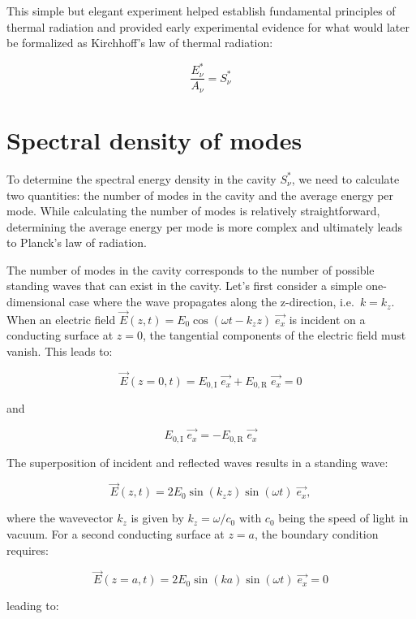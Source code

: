 \documentclass[
  a4paper,
]{book}
\begin{document}
\begin{tcolorbox}
This simple but elegant experiment helped establish fundamental
principles of thermal radiation and provided early experimental evidence
for what would later be formalized as Kirchhoff's law of thermal
radiation:

\[\frac{E^{\ast}_{\nu}}{A_{\nu}} = S^{\ast}_{\nu}\]

\end{tcolorbox}

\section{Spectral density of modes}\label{spectral-density-of-modes}

To determine the spectral energy density in the cavity
\(S^{\ast}_{\nu}\), we need to calculate two quantities: the number of
modes in the cavity and the average energy per mode. While calculating
the number of modes is relatively straightforward, determining the
average energy per mode is more complex and ultimately leads to Planck's
law of radiation.

The number of modes in the cavity corresponds to the number of possible
standing waves that can exist in the cavity. Let's first consider a
simple one-dimensional case where the wave propagates along the
z-direction, i.e.~\(k=k_z\). When an electric field
\(\vec{E} \left( z, t \right) = E_0 \cos \left( \omega t - k_z z \right) \; \vec{e_x}\)
is incident on a conducting surface at \(z = 0\), the tangential
components of the electric field must vanish. This leads to:

\[
\vec{E} \left( z = 0, t \right) = E_{0,\mathrm{I}} \; \vec{e_x} + E_{0,\mathrm{R}} \; \vec{e_x} = 0
\]

and

\[
E_{0,\mathrm{I}} \; \vec{e_x} = -E_{0,\mathrm{R}} \; \vec{e_x}
\]

The superposition of incident and reflected waves results in a standing
wave:

\[
\vec{E} \left( z, t \right) = 2 E_0 \sin \left( k_z z \right) \sin \left( \omega t \right) \; \vec{e_x} \mathrm{,}
\]

where the wavevector \(k_z\) is given by \(k_z = \omega / c_0\) with
\(c_0\) being the speed of light in vacuum. For a second conducting
surface at \(z = a\), the boundary condition requires:

\[
\vec{E} \left( z = a, t \right) = 2 E_0 \sin \left( k a \right) \sin \left( \omega t \right) \; \vec{e_x} = 0
\]

leading to:
\end{document}
